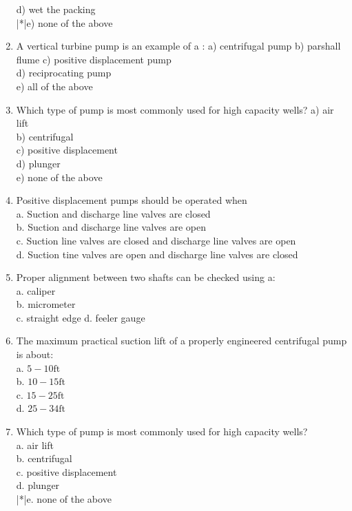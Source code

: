 \begin{enumerate}[1.]
d) wet the packing\\
|*|e) none of the above\\
\item A vertical turbine pump is an example of a : a) centrifugal pump b) parshall flume c) positive displacement pump\\
d) reciprocating pump\\
e) all of the above\\
\item Which type of pump is most commonly used for high capacity wells? a) air lift\\
b) centrifugal\\
c) positive displacement\\
d) plunger\\
e) none of the above\\
\item Positive displacement pumps should be operated when\\
a. Suction and discharge line valves are closed\\
b. Suction and discharge line valves are open\\
c. Suction line valves are closed and discharge line valves are open\\
d. Suction tine valves are open and discharge line valves are closed\\
\item Proper alignment between two shafts can be checked using a:\\
a. caliper\\
b. micrometer\\
c. straight edge d. feeler gauge\\
\item The maximum practical suction lift of a properly engineered centrifugal pump is about:\\
a. $5-10 \mathrm{ft}$\\
b. $10-15 \mathrm{ft}$\\
c. $15-25 \mathrm{ft}$\\
d. $25-34 \mathrm{ft}$\\
\item Which type of pump is most commonly used for high capacity wells?\\
a. air lift\\
b. centrifugal\\
c. positive displacement\\
d. plunger\\
|*|e. none of the above\\

\end{enumerate}
